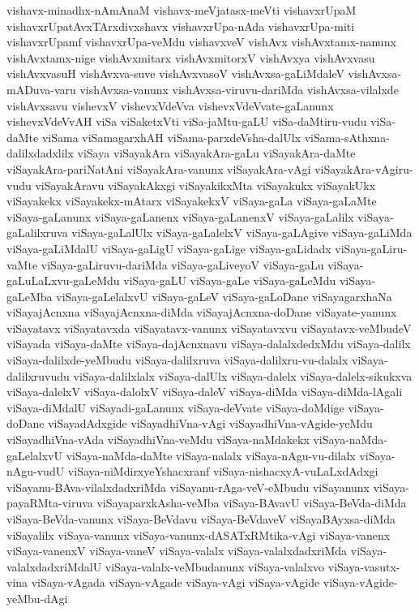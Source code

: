{vishavx-minadhx-nAmAnaM
vishavx-meVjatasx-meVti
vishavxrUpaM
vishavxrUpatAvxTArxdivxshavx
vishavxrUpa-nAda
vishavxrUpa-miti
vishavxrUpamf
vishavxrUpa-veMdu
vishavxveV
vishAvx
vishAvxtamx-nanunx
vishAvxtamx-nige
vishAvxmitarx
vishAvxmitorxV
vishAvxya
vishAvxvasu
vishAvxvasuH
vishAvxva-suve
vishAvxvasoV
vishAvxsa-gaLiMdaleV
vishAvxsa-mADuva-varu
vishAvxsa-vanunx
vishAvxsa-viruvu-dariMda
vishAvxsa-vilalxde
vishAvxsavu
vishevxV
vishevxVdeVva
vishevxVdeVvate-gaLanunx
vishevxVdeVvAH
viSa
viSaketxVti
viSa-jaMtu-gaLU
viSa-daMtiru-vudu
viSa-daMte
viSama
viSamagarxhAH
viSama-parxdeVsha-dalUlx
viSama-sAthxna-dalilxdadxlilx
viSaya
viSayakAra
viSayakAra-gaLu
viSayakAra-daMte
viSayakAra-pariNatAni
viSayakAra-vanunx
viSayakAra-vAgi
viSayakAra-vAgiru-vudu
viSayakAravu
viSayakAkxgi
viSayakikxMta
viSayakukx
viSayakUkx
viSayakekx
viSayakekx-mAtarx
viSayakekxV
viSaya-gaLa
viSaya-gaLaMte
viSaya-gaLanunx
viSaya-gaLanenx
viSaya-gaLanenxV
viSaya-gaLalilx
viSaya-gaLalilxruva
viSaya-gaLalUlx
viSaya-gaLalelxV
viSaya-gaLAgive
viSaya-gaLiMda
viSaya-gaLiMdalU
viSaya-gaLigU
viSaya-gaLige
viSaya-gaLidadx
viSaya-gaLiru-vaMte
viSaya-gaLiruvu-dariMda
viSaya-gaLiveyoV
viSaya-gaLu
viSaya-gaLuLaLxvu-gaLeMdu
viSaya-gaLU
viSaya-gaLe
viSaya-gaLeMdu
viSaya-gaLeMba
viSaya-gaLelalxvU
viSaya-gaLeV
viSaya-gaLoDane
viSayagarxhaNa
viSayajAcnxna
viSayajAcnxna-diMda
viSayajAcnxna-doDane
viSayate-yanunx
viSayatavx
viSayatavxda
viSayatavx-vanunx
viSayatavxvu
viSayatavx-veMbudeV
viSayada
viSaya-daMte
viSaya-dajAcnxnavu
viSaya-dalalxdedxMdu
viSaya-dalilx
viSaya-dalilxde-yeMbudu
viSaya-dalilxruva
viSaya-dalilxru-vu-dalalx
viSaya-dalilxruvudu
viSaya-dalilxlalx
viSaya-dalUlx
viSaya-dalelx
viSaya-dalelx-sikukxva
viSaya-dalelxV
viSaya-dalolxV
viSaya-daleV
viSaya-diMda
viSaya-diMda-lAgali
viSaya-diMdalU
viSayadi-gaLanunx
viSaya-deVvate
viSaya-doMdige
viSaya-doDane
viSayadAdxgide
viSayadhiVna-vAgi
viSayadhiVna-vAgide-yeMdu
viSayadhiVna-vAda
viSayadhiVna-veMdu
viSaya-naMdakekx
viSaya-naMda-gaLelalxvU
viSaya-naMda-daMte
viSaya-nalalx
viSaya-nAgu-vu-dilalx
viSaya-nAgu-vudU
viSaya-niMdirxyeYshacxranf
viSaya-nishacxyA-vuLaLxdAdxgi
viSayanu-BAva-vilalxdadxriMda
viSayanu-rAga-veV-eMbudu
viSayanunx
viSaya-payaRMta-viruva
viSayaparxkAsha-veMba
viSaya-BAvavU
viSaya-BeVda-diMda
viSaya-BeVda-vanunx
viSaya-BeVdavu
viSaya-BeVdaveV
viSayaBAyxsa-diMda
viSayalilx
viSaya-vanunx
viSaya-vanunx-dASATxRMtika-vAgi
viSaya-vanenx
viSaya-vanenxV
viSaya-vaneV
viSaya-valalx
viSaya-valalxdadxriMda
viSaya-valalxdadxriMdalU
viSaya-valalx-veMbudanunx
viSaya-valalxvo
viSaya-vasutx-vina
viSaya-vAgada
viSaya-vAgade
viSaya-vAgi
viSaya-vAgide
viSaya-vAgide-yeMbu-dAgi
}

